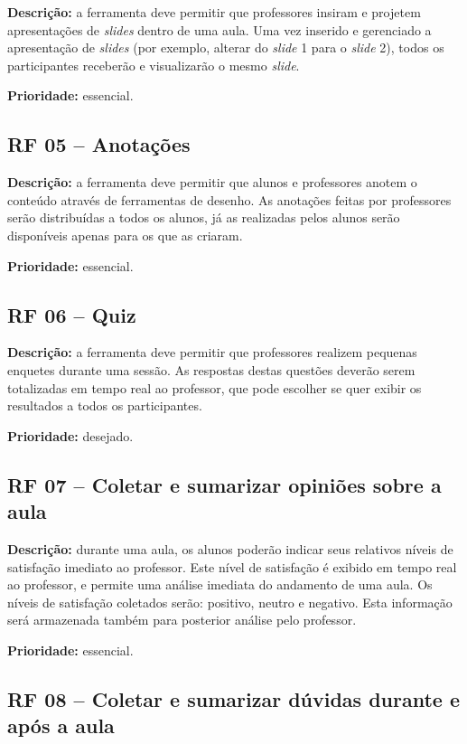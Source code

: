 \textbf{Descrição:} a ferramenta deve permitir que professores insiram e projetem apresentações de \emph{slides} dentro de uma aula. Uma vez inserido e gerenciado a apresentação de \emph{slides} (por exemplo, alterar do \emph{slide} 1 para o \emph{slide} 2), todos os participantes receberão e visualizarão o mesmo \emph{slide}.

\textbf{Prioridade:} essencial.

\subsection{RF 05 – Anotações}

\textbf{Descrição:} a ferramenta deve permitir que alunos e professores anotem o conteúdo através de ferramentas de desenho. As anotações feitas por professores serão distribuídas a todos os alunos, já as realizadas pelos alunos serão disponíveis apenas para os que as criaram.

\textbf{Prioridade:} essencial.

\subsection{RF 06 – Quiz}

\textbf{Descrição:} a ferramenta deve permitir que professores realizem pequenas enquetes durante uma sessão. As respostas destas questões deverão serem totalizadas em tempo real ao professor, que pode escolher se quer exibir os resultados a todos os participantes.

\textbf{Prioridade:} desejado.

\subsection{RF 07 – Coletar e sumarizar opiniões sobre a aula}

\textbf{Descrição:} durante uma aula, os alunos poderão indicar seus relativos níveis de satisfação imediato ao professor. Este nível de satisfação é exibido em tempo real ao professor, e permite uma análise imediata do andamento de uma aula. Os níveis de satisfação coletados serão: positivo, neutro e negativo. Esta informação será armazenada também para posterior análise pelo professor.

\textbf{Prioridade:} essencial.

\subsection{RF 08 – Coletar e sumarizar dúvidas durante e após a aula}

